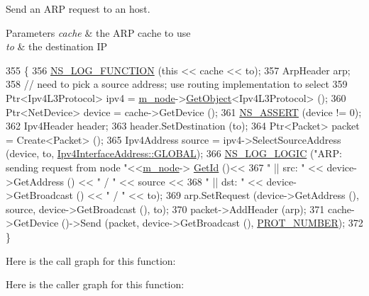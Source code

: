 Send an A\+RP request to an host. 


\begin{DoxyParams}{Parameters}
{\em cache} & the A\+RP cache to use \\
\hline
{\em to} & the destination IP \\
\hline
\end{DoxyParams}

\begin{DoxyCode}
355 \{
356   \hyperlink{log-macros-disabled_8h_a90b90d5bad1f39cb1b64923ea94c0761}{NS\_LOG\_FUNCTION} (\textcolor{keyword}{this} << cache << to);
357   ArpHeader arp;
358   \textcolor{comment}{// need to pick a source address; use routing implementation to select}
359   Ptr<Ipv4L3Protocol> ipv4 = \hyperlink{classns3_1_1ArpL3Protocol_aa1a2d173cfb3fd7e2f8eff8504a114da}{m\_node}->\hyperlink{classns3_1_1Object_a13e18c00017096c8381eb651d5bd0783}{GetObject}<Ipv4L3Protocol> ();
360   Ptr<NetDevice> device = cache->GetDevice ();
361   \hyperlink{assert_8h_a6dccdb0de9b252f60088ce281c49d052}{NS\_ASSERT} (device != 0);
362   Ipv4Header header;
363   header.SetDestination (to);
364   Ptr<Packet> packet = Create<Packet> ();
365   Ipv4Address source = ipv4->SelectSourceAddress (device,  to, 
      \hyperlink{classns3_1_1Ipv4InterfaceAddress_a329cea433e74f717c26c9e51c4fcd3d8ae144856017bcfb529872c91204d462b2}{Ipv4InterfaceAddress::GLOBAL});
366   \hyperlink{group__logging_ga88acd260151caf2db9c0fc84997f45ce}{NS\_LOG\_LOGIC} (\textcolor{stringliteral}{"ARP: sending request from node "}<<\hyperlink{classns3_1_1ArpL3Protocol_aa1a2d173cfb3fd7e2f8eff8504a114da}{m\_node}->
      \hyperlink{classns3_1_1Node_aaf49b64a843565ce3812326313b370ac}{GetId} ()<<
367                 \textcolor{stringliteral}{" || src: "} << device->GetAddress () << \textcolor{stringliteral}{" / "} << source <<
368                 \textcolor{stringliteral}{" || dst: "} << device->GetBroadcast () << \textcolor{stringliteral}{" / "} << to);
369   arp.SetRequest (device->GetAddress (), source, device->GetBroadcast (), to);
370   packet->AddHeader (arp);
371   cache->GetDevice ()->Send (packet, device->GetBroadcast (), \hyperlink{classns3_1_1ArpL3Protocol_a836aec5bc5e5a8ea1d7f46609dc9cc2c}{PROT\_NUMBER});
372 \}
\end{DoxyCode}


Here is the call graph for this function\+:




Here is the caller graph for this function\+:


